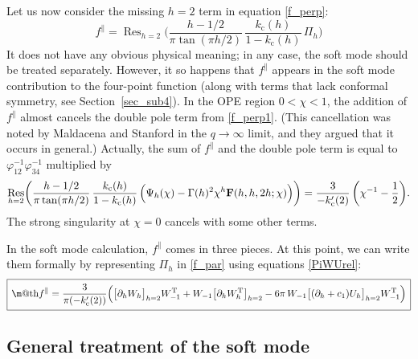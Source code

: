 \documentclass[12pt]{article}
\makeatletter
\newcommand*{\wideboxed}[1]{\setlength{\fboxsep}{1ex}%
  \fbox{\m@th$\displaystyle#1$}}
\newcommand{\hgfs}{\mathbf{F}}
\DeclareMathOperator{\Ress}{Res}
\newcommand{\Tt}{\mathrm{T}}
\newcommand{\cc}{\mathrm{c}}
\newcommand{\vp}{\varphi}
\makeatother
\begin{document}
Let us now consider the missing $h=2$ term in equation \eqref{f_perp}:
\begin{equation}\label{f_par}
f^{\parallel}=\Ress_{h=2}
\biggl(\frac{h-1/2}{\pi\tan(\pi h/2)}\,
\frac{k_{\cc}(h)}{1-k_{\cc}(h)}\,\Pi_h\biggr)
\end{equation}
It does not have any obvious physical meaning; in any case, the soft mode should be treated separately. However, it so happens that $f^{\parallel}$ appears in the soft mode contribution to the four-point function (along with terms that lack conformal symmetry, see Section~\ref{sec_sub4}). In the OPE region $0<\chi<1$, the addition of $f^{\parallel}$ almost cancels the double pole term from \eqref{f_perp1}. (This cancellation was noted by Maldacena and Stanford \cite{MS16} in the $q\to\infty$ limit, and they argued that it occurs in general.) Actually, the sum of $f^{\parallel}$ and the double pole term is equal to $\vp_{12}^{-1}\vp_{34}^{-1}$ multiplied by
\begin{equation}\label{f_par_plus}
\Ress_{h=2}
\biggl(\frac{h-1/2}{\pi\tan(\pi h/2)}\,
\frac{k_{\cc}(h)}{1-k_{\cc}(h)}\,
\Bigl(\Psi_h(\chi)-\Gamma(h)^2\chi^h\hgfs(h,h,2h;\chi)\Bigr)\biggr)
=\frac{3}{-k_{\cc}'(2)}\,\biggl(\chi^{-1}-\frac{1}{2}\biggr).
\end{equation}
The strong singularity at $\chi=0$ cancels with some other terms.

In the soft mode calculation, $f^{\parallel}$ comes in three pieces. At this point, we can write them formally by representing $\Pi_h$ in \eqref{f_par} using equations \eqref{PiWUrel}:
\begin{equation} \label{f_par_long}
\wideboxed{
f^{\parallel}=\frac{3}{\pi(-k'_{\cc}(2))}
\Bigl(\bigl[\partial_{h}W_{h}\bigr]_{h=2}W_{-1}^{\Tt}
+W_{-1}\bigl[\partial_{h}W_{h}^{\Tt}\bigr]_{h=2}
-6\pi\,W_{-1}\bigl[(\partial_{h}+c_{1})U_{h}\bigr]_{h=2}W_{-1}^{\Tt}\Bigr)
}
\end{equation}

\subsection{General treatment of the soft mode}\label{sec_gensoft}
\end{document}
